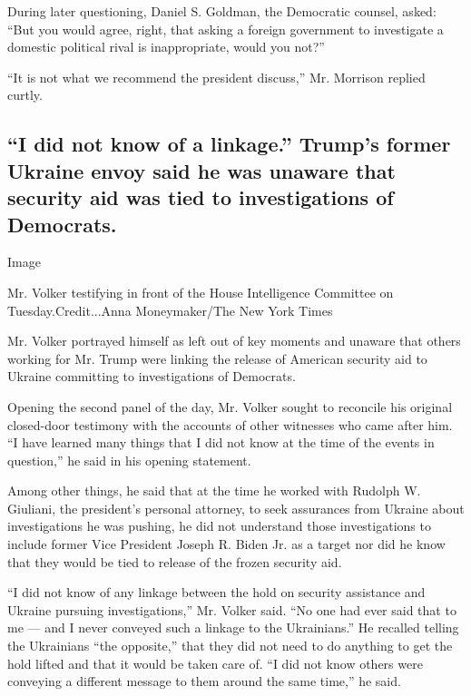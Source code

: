During later questioning, Daniel S. Goldman, the Democratic counsel,
asked: ``But you would agree, right, that asking a foreign government to
investigate a domestic political rival is inappropriate, would you
not?''

``It is not what we recommend the president discuss,'' Mr. Morrison
replied curtly.

\hypertarget{i-did-not-know-of-a-linkage-trumps-former-ukraine-envoy-said-he-was-unaware-that-security-aid-was-tied-to-investigations-of-democrats}{%
\subsection{``I did not know of a linkage.'' Trump's former Ukraine
envoy said he was unaware that security aid was tied to investigations
of
Democrats.}\label{i-did-not-know-of-a-linkage-trumps-former-ukraine-envoy-said-he-was-unaware-that-security-aid-was-tied-to-investigations-of-democrats}}

Image

Mr. Volker testifying in front of the House Intelligence Committee on
Tuesday.Credit...Anna Moneymaker/The New York Times

Mr. Volker portrayed himself as left out of key moments and unaware that
others working for Mr. Trump were linking the release of American
security aid to Ukraine committing to investigations of Democrats.

Opening the second panel of the day, Mr. Volker sought to reconcile his
original closed-door testimony with the accounts of other witnesses who
came after him. ``I have learned many things that I did not know at the
time of the events in question,'' he said in his opening statement.

Among other things, he said that at the time he worked with Rudolph W.
Giuliani, the president's personal attorney, to seek assurances from
Ukraine about investigations he was pushing, he did not understand those
investigations to include former Vice President Joseph R. Biden Jr. as a
target nor did he know that they would be tied to release of the frozen
security aid.

``I did not know of any linkage between the hold on security assistance
and Ukraine pursuing investigations,'' Mr. Volker said. ``No one had
ever said that to me --- and I never conveyed such a linkage to the
Ukrainians.'' He recalled telling the Ukrainians ``the opposite,'' that
they did not need to do anything to get the hold lifted and that it
would be taken care of. ``I did not know others were conveying a
different message to them around the same time,'' he said.

